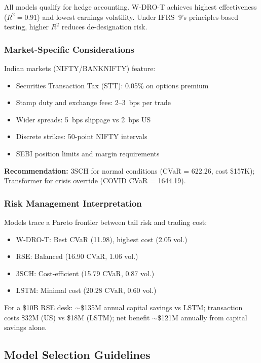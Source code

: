 All models qualify for hedge accounting. W-DRO-T achieves highest effectiveness ($R^2 = 0.91$) and lowest earnings volatility. Under IFRS~9's principles-based testing, higher $R^2$ reduces de-designation risk.

\subsubsection{Market-Specific Considerations}

Indian markets (NIFTY/BANKNIFTY) feature:
\begin{itemize}[noitemsep]
    \item Securities Transaction Tax (STT): 0.05\% on options premium
    \item Stamp duty and exchange fees: 2--3~bps per trade
    \item Wider spreads: 5~bps slippage vs 2~bps US
    \item Discrete strikes: 50-point NIFTY intervals
    \item SEBI position limits and margin requirements
\end{itemize}
\textbf{Recommendation:} 3SCH for normal conditions (CVaR = 622.26, cost \$157K); Transformer for crisis override (COVID CVaR = 1644.19).

\subsubsection{Risk Management Interpretation}

Models trace a Pareto frontier between tail risk and trading cost:
\begin{itemize}[noitemsep]
    \item W-DRO-T: Best CVaR (11.98), highest cost (2.05 vol.)
    \item RSE: Balanced (16.90 CVaR, 1.06 vol.)
    \item 3SCH: Cost-efficient (15.79 CVaR, 0.87 vol.)
    \item LSTM: Minimal cost (20.28 CVaR, 0.60 vol.)
\end{itemize}

For a \$10B RSE desk: $\sim$\$135M annual capital savings vs LSTM; transaction costs \$32M (US) vs \$18M (LSTM); net benefit $\sim$\$121M annually from capital savings alone.

\subsection{Model Selection Guidelines}
\label{sec:selection}

